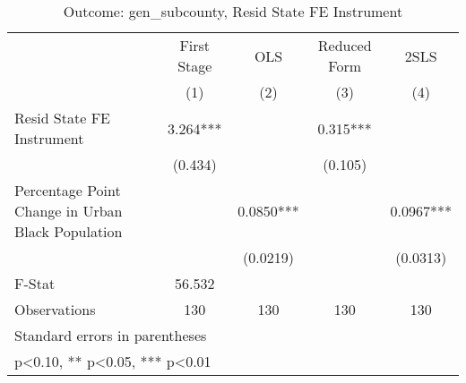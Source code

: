 \begin{table}[htbp]\centering
\def\sym#1{\ifmmode^{#1}\else\(^{#1}\)\fi}
\caption{Outcome: gen\_subcounty, Resid State FE Instrument}
\begin{tabular}{l*{4}{c}}
\toprule
                    & First Stage   &         OLS   &Reduced Form   &        2SLS   \\
                    &\multicolumn{1}{c}{(1)}   &\multicolumn{1}{c}{(2)}   &\multicolumn{1}{c}{(3)}   &\multicolumn{1}{c}{(4)}   \\
\midrule
Resid State FE Instrument&       3.264***&               &       0.315***&               \\
                    &     (0.434)   &               &     (0.105)   &               \\
\addlinespace
Percentage Point Change in Urban Black Population&               &      0.0850***&               &      0.0967***\\
                    &               &    (0.0219)   &               &    (0.0313)   \\
\midrule
F-Stat              &      56.532   &               &               &               \\
Observations        &         130   &         130   &         130   &         130   \\
\bottomrule
\multicolumn{5}{l}{\footnotesize Standard errors in parentheses}\\
\multicolumn{5}{l}{\footnotesize * p<0.10, ** p<0.05, *** p<0.01}\\
\end{tabular}
\end{table}

